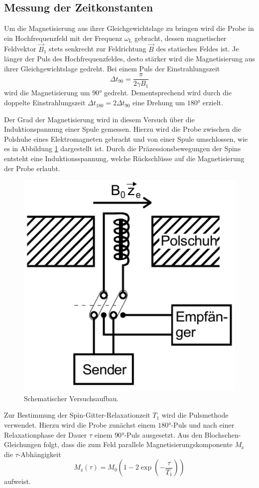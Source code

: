 \subsection{Messung der Zeitkonstanten}
Um die Magnetisierung aus ihrer Gleichgewichtslage zu bringen wird die Probe in ein Hochfrequenzfeld mit der Frequenz $\omega_\text{L}$ gebracht, dessen magnetischer Feldvektor $\vec{B}_1$ stets senkrecht zur Feldrichtung $\vec{B}$ des statisches Feldes ist.
Je länger der Puls des Hochfrequenzfeldes, desto stärker wird die Magnetisierung aus ihrer Gleichgewichtslage gedreht.
Bei einem Puls der Einstrahlungszeit 
\begin{equation}
    \Delta t_{90}=\frac{\pi}{2\gamma B_1} 
\end{equation}
wird die Magnetisierung um $90°$ gedreht.
Dementsprechend wird durch die doppelte Einstrahlungszeit $\Delta t_{180}=2 \Delta t_{90}$ eine Drehung um $180°$ erzielt.

Der Grad der Magnetisierung wird in diesem Versuch über die Induktionspannung einer Spule gemessen.
Hierzu wird die Probe zwischen die Polshuhe eines Elektromagneten gebracht und von einer Spule umschlossen, wie es in Abbildung \ref{fig:fig1} dargestellt ist.
Durch die Präzessionsbewegungen der Spins entsteht eine Induktionsspannung, welche Rückschlüsse auf die Magnetisierung der Probe erlaubt.

\begin{figure}[H]
\centering
\includegraphics[width=0.4\linewidth]{figs/Aufbau}
\caption{Schematischer Versuchsaufbau. \cite{Finke}}
\label{fig:fig1}
\end{figure}

Zur Bestimmung der Spin-Gitter-Relaxationzeit $T_1$ wird die Pulsmethode verwendet.
Hierzu wird die Probe zunächst einem $180°$-Puls und nach einer Relaxationphase der Dauer $\tau$ einem $90°$-Puls ausgesetzt.
Aus den Blochschen-Gleichungen folgt, dass die zum Feld parallele Magnetisierungskomponente $M_\text{z}$ die $\tau$-Abhängigkeit
\begin{equation}
    M_\text{z}(\tau)=M_0\left(1-2\exp(-\frac{\tau}{T_1})\right)
\end{equation}
aufweist.

